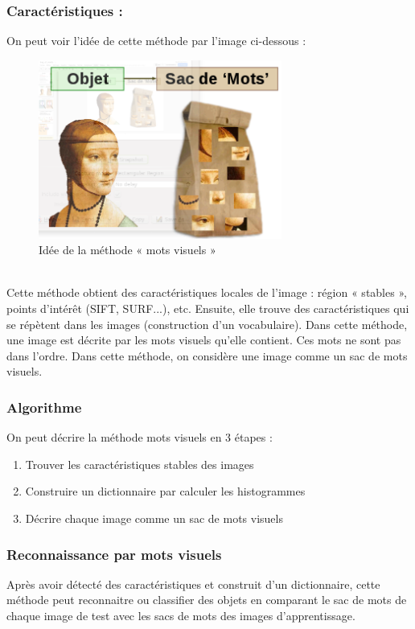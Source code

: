 \documentclass[french,12pt,a4paper,oneside,notitlepage]{report}
\begin{document}
\subsubsection{Caractéristiques : }
On peut voir l'idée de cette méthode par l'image ci-dessous :
\begin{figure}[ht]
	\begin{center}
	  \includegraphics[width=8cm]{img1.png}
	\end{center}
	 \caption{Idée de la méthode « mots visuels »}
\end{figure}\\

Cette méthode obtient des caractéristiques locales de l'image : région « stables », points d'intérêt (SIFT, SURF...), etc. Ensuite, elle trouve des caractéristiques qui se répètent dans les images (construction d'un vocabulaire). Dans cette méthode, une image est décrite par les mots visuels qu'elle contient. Ces mots ne sont pas dans l'ordre. Dans cette méthode, on considère une image comme un sac de mots visuels.

\subsubsection{Algorithme}
On peut décrire la méthode mots visuels en 3 étapes :
\begin{enumerate}
\item Trouver les caractéristiques stables des images
\item Construire un dictionnaire par calculer les histogrammes
\item Décrire chaque image comme un sac de mots visuels
\end{enumerate}

\subsubsection{Reconnaissance par mots visuels}
Après avoir détecté des caractéristiques et construit d'un dictionnaire, cette méthode peut reconnaitre ou classifier des objets en comparant le sac de mots de chaque image de test avec les sacs de mots des images d'apprentissage.\\
\end{document}
